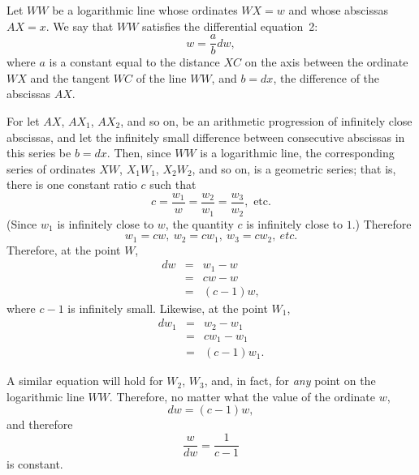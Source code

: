 \documentclass[polutonikogreek,english,twoside,openright]{article}
\begin{document}
 Let $WW$ be a logarithmic
line whose ordinates $WX = w$ and whose abscissas $AX = x$.  We say
that $WW$ satisfies the differential equation~2:
$$w = \frac{a}{b}dw,$$
where $a$ is a constant equal to the distance $XC$ on the axis between
the ordinate $WX$ and the tangent $WC$ of the line $WW$, and $b=dx$,
the difference of the abscissas $AX$.

For let $AX$, $AX_1$, $AX_2$, and so on, be an arithmetic progression
of infinitely close abscissas, and let the infinitely small difference
between consecutive abscissas in this series be $b =dx$.  Then, since
$WW$ is a logarithmic line, the corresponding series of ordinates
$XW$, $X_1W_1$, $X_2W_2$, and so on, is a geometric series; that is,
there is one constant ratio $c$ such that
$$ c= \frac{w_1}{w} = \frac{w_2}{w_1} = \frac{w_3}{w_2}, \mbox{ etc.}$$
(Since $w_1$ is infinitely close to $w$, the quantity $c$ is infinitely close to $1$.)
Therefore
$$ w_1 = cw,\ w_2 = cw_1,\ w_3 = cw_2,\ etc.$$
Therefore, at the point $W$,
\begin{eqnarray*}
dw & = & w_1 - w\\
& = & cw -w\\
& = & (c-1)w,
\end{eqnarray*}
where $c-1$ is infinitely small.
 Likewise, at the point $W_1$,
 \begin{eqnarray*}
dw_1 & = & w_2 - w_1\\
& = & cw_1 -w_1\\
& = & (c-1)w_1.
\end{eqnarray*}

\hspace{-1em} A similar equation will hold for $W_2$, $W_3$, and, in
fact, for {\em any} point on the logarithmic line $WW$.  Therefore, no
matter what the value of the ordinate $w$,
$$dw = (c-1)w,$$
and therefore
$$\frac{w}{dw} = \frac{1}{c-1}$$
is constant.  
\end{document}
